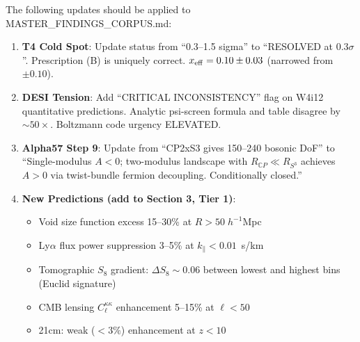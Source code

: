 \documentclass[11pt,a4paper]{article}
\newcommand{\CP}{\mathbb{C}P}
\begin{document}
The following updates should be applied to MASTER\_FINDINGS\_CORPUS.md:

\begin{enumerate}
\item \textbf{T4 Cold Spot}: Update status from ``0.3--1.5 sigma''
  to ``RESOLVED at $0.3\sigma$''.  Prescription (B) is uniquely
  correct.  $x_{\rm eff} = 0.10 \pm 0.03$ (narrowed from $\pm 0.10$).

\item \textbf{DESI Tension}: Add ``CRITICAL INCONSISTENCY'' flag on
  W4i12 quantitative predictions.  Analytic psi-screen formula and
  table disagree by $\sim 50\times$.  Boltzmann code urgency
  ELEVATED.

\item \textbf{Alpha57 Step 9}: Update from ``CP2xS3 gives 150--240
  bosonic DoF'' to ``Single-modulus $A < 0$; two-modulus landscape
  with $R_{\CP} \ll R_{S^3}$ achieves $A > 0$ via twist-bundle
  fermion decoupling.  Conditionally closed.''

\item \textbf{New Predictions (add to Section 3, Tier 1)}:
  \begin{itemize}[nosep]
  \item Void size function excess 15--30\% at $R > 50\;h^{-1}$Mpc
  \item Ly$\alpha$ flux power suppression 3--5\% at
    $k_\parallel < 0.01$~s/km
  \item Tomographic $S_8$ gradient: $\Delta S_8 \sim 0.06$ between
    lowest and highest bins (Euclid signature)
  \item CMB lensing $C_\ell^{\kappa\kappa}$ enhancement 5--15\%
    at $\ell < 50$
  \item 21cm: weak ($< 3\%$) enhancement at $z < 10$
  \end{itemize}
\end{enumerate}
\end{document}
